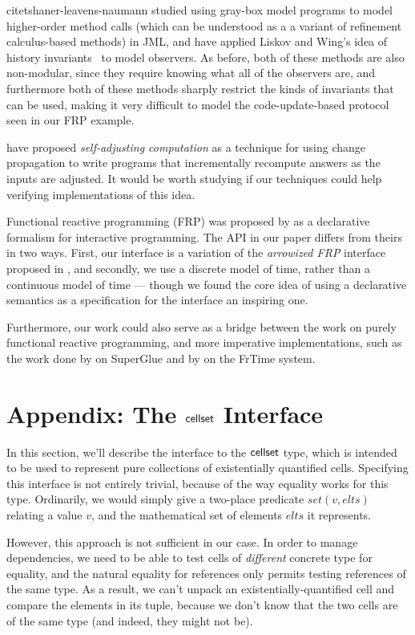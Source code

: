 citet{shaner-leavens-naumann} studied using gray-box model
programs to model higher-order method calls (which can be understood
as a a variant of refinement calculus-based methods) in JML, and 
\citet{history-invariants} have applied Liskov and Wing's
idea of history invariants~\cite{liskov-wing} to model observers. As
before, both of these methods are also non-modular, since they require
knowing what all of the observers are, and furthermore both of these
methods sharply restrict the kinds of invariants that can be used,
making it very difficult to model the code-update-based protocol seen
in our FRP example.

\citet{self-adjusting} have proposed
\emph{self-adjusting computation} as a technique for using change
propagation to write programs that incrementally
recompute answers as the inputs are adjusted. It would be worth 
studying if our techniques could help verifying implementations of this
idea.

Functional reactive programming (FRP) was proposed by \citet{frp} as a
declarative formalism for interactive programming. The API in our
paper differs from theirs in two ways. First, our interface is a
variation of the \emph{arrowized FRP} interface proposed in
\cite{afrp}, and secondly, we use a discrete model of time, rather
than a continuous model of time --- though we found the core idea of
using a declarative semantics as a specification for the interface an
inspiring one.

Furthermore, our work could also serve as a bridge between the work on
purely functional reactive programming, and more imperative
implementations, such as the work done by \citet{superglue} on
SuperGlue and by \citet{frtime} on the FrTime system.


\section{Appendix: The $\mathsf{cellset}$ Interface}

In this section, we'll describe the interface to the $\mathsf{cellset}$ type,
which is intended to be used to represent pure collections of
existentially quantified cells. Specifying this interface is not
entirely trivial, because of the way equality works for this
type. Ordinarily, we would simply give a two-place predicate $set(v,
elts)$ relating a value $v$, and the mathematical set of elements
$elts$ it represents.

However, this approach is not sufficient in our case. In order to
manage dependencies, we need to be able to test cells of
\emph{different} concrete type for equality, and the natural equality
for references only permits testing references of the same type. As a
result, we can't unpack an existentially-quantified cell and compare
the elements in its tuple, because we don't know that the two cells
are of the same type (and indeed, they might not be). 

